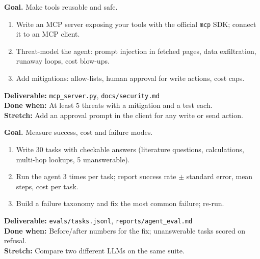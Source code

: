 \begin{tcolorbox}[enhanced,breakable,colback=white,colframe=sun,boxrule=0.8pt,arc=2pt,left=7pt,right=7pt,top=4pt,bottom=4pt,
  title={\bfseries Thursday --- Expose tools via MCP and review security\hfill\normalfont\small 3 h},coltitle=white,colbacktitle=sun,fonttitle=\small]
\textbf{Goal.} Make tools reusable and safe.
\begin{enumerate}[itemsep=1pt,topsep=2pt]
  \item Write an MCP server exposing your tools with the official \texttt{mcp} SDK; connect it to an MCP client.
  \item Threat-model the agent: prompt injection in fetched pages, data exfiltration, runaway loops, cost blow-ups.
  \item Add mitigations: allow-lists, human approval for write actions, cost caps.
\end{enumerate}
\textbf{\color{dataC}Deliverable:} \texttt{mcp\_server.py}, \texttt{docs/security.md}\\
\textbf{\color{navy}Done when:} At least 5 threats with a mitigation and a test each.\\
\textbf{\color{skillC}Stretch:} Add an approval prompt in the client for any write or send action.
\end{tcolorbox}

\begin{tcolorbox}[enhanced,breakable,colback=white,colframe=sun,boxrule=0.8pt,arc=2pt,left=7pt,right=7pt,top=4pt,bottom=4pt,
  title={\bfseries Friday --- A 30-task evaluation suite\hfill\normalfont\small 3 h},coltitle=white,colbacktitle=sun,fonttitle=\small]
\textbf{Goal.} Measure success, cost and failure modes.
\begin{enumerate}[itemsep=1pt,topsep=2pt]
  \item Write 30 tasks with checkable answers (literature questions, calculations, multi-hop lookups, 5 unanswerable).
  \item Run the agent 3 times per task; report success rate $\pm$ standard error, mean steps, cost per task.
  \item Build a failure taxonomy and fix the most common failure; re-run.
\end{enumerate}
\textbf{\color{dataC}Deliverable:} \texttt{evals/tasks.jsonl}, \texttt{reports/agent\_eval.md}\\
\textbf{\color{navy}Done when:} Before/after numbers for the fix; unanswerable tasks scored on refusal.\\
\textbf{\color{skillC}Stretch:} Compare two different LLMs on the same suite.
\end{tcolorbox}

